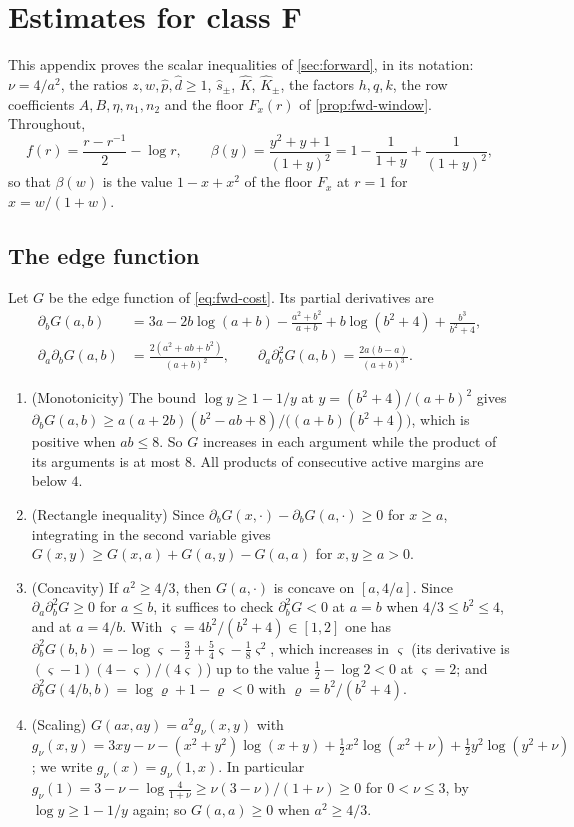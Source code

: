 \section{Estimates for class F}\label{app:forward-estimates}

This appendix proves the scalar inequalities of \cref{sec:forward}, in its notation: $\nu=4/a^2$,
the ratios $z,w,\hat p,\hat d\ge1$, $\hat s_\pm$, $\hat K$, $\hat K_\pm$, the factors $h,q,k$, the
row coefficients $A,B,\eta,n_1,n_2$ and the floor $F_x(r)$ of \cref{prop:fwd-window}. Throughout,
\[
f(r)=\frac{r-r^{-1}}2-\log r,\qquad \beta(y)=\frac{y^2+y+1}{(1+y)^2}=1-\frac1{1+y}+\frac1{(1+y)^2},
\]
so that $\beta(w)$ is the value $1-x+x^2$ of the floor $F_x$ at $r=1$ for $x=w/(1+w)$.

\subsection{The edge function}\label{app:fwd-edge}

Let $G$ be the edge function of \eqref{eq:fwd-cost}. Its partial derivatives are
\begin{align*}
\partial_bG(a,b)&=3a-2b\log(a+b)-\frac{a^2+b^2}{a+b}+b\log(b^2+4)+\frac{b^3}{b^2+4},\\
\partial_a\partial_bG(a,b)&=\frac{2(a^2+ab+b^2)}{(a+b)^2},\qquad
\partial_a\partial_b^2G(a,b)=\frac{2a(b-a)}{(a+b)^3}.
\end{align*}
\begin{enumerate}
\item (Monotonicity) The bound $\log y\ge1-1/y$ at $y=(b^2+4)/(a+b)^2$ gives
  $\partial_bG(a,b)\ge a(a+2b)(b^2-ab+8)/\bigl((a+b)(b^2+4)\bigr)$, which is positive when
  $ab\le8$. So $G$ increases in each argument while the product of its arguments is at most $8$.
  All products of consecutive active margins are below $4$.
\item (Rectangle inequality) Since $\partial_bG(x,\cdot)-\partial_bG(a,\cdot)\ge0$ for $x\ge a$,
  integrating in the second variable gives $G(x,y)\ge G(x,a)+G(a,y)-G(a,a)$ for $x,y\ge a>0$.
\item (Concavity) If $a^2\ge4/3$, then $G(a,\cdot)$ is concave on $[a,4/a]$. Since
  $\partial_a\partial_b^2G\ge0$ for $a\le b$, it suffices to check $\partial_b^2G<0$ at $a=b$ when
  $4/3\le b^2\le4$, and at $a=4/b$. With $\varsigma=4b^2/(b^2+4)\in[1,2]$ one has
  $\partial_b^2G(b,b)=-\log\varsigma-\frac32+\frac54\varsigma-\frac18\varsigma^2$, which increases in
  $\varsigma$ (its derivative is $(\varsigma-1)(4-\varsigma)/(4\varsigma)$) up to the value
  $\frac12-\log2<0$ at $\varsigma=2$; and $\partial_b^2G(4/b,b)=\log\varrho+1-\varrho<0$ with
  $\varrho=b^2/(b^2+4)$.
\item (Scaling) $G(ax,ay)=a^2g_\nu(x,y)$ with
  $g_\nu(x,y)=3xy-\nu-(x^2+y^2)\log(x+y)+\frac12x^2\log(x^2+\nu)+\frac12y^2\log(y^2+\nu)$; we write
  $g_\nu(x)=g_\nu(1,x)$. In particular $g_\nu(1)=3-\nu-\log\frac4{1+\nu}\ge\nu(3-\nu)/(1+\nu)\ge0$
  for $0<\nu\le3$, by $\log y\ge1-1/y$ again; so $G(a,a)\ge0$ when $a^2\ge4/3$.
\end{enumerate}

